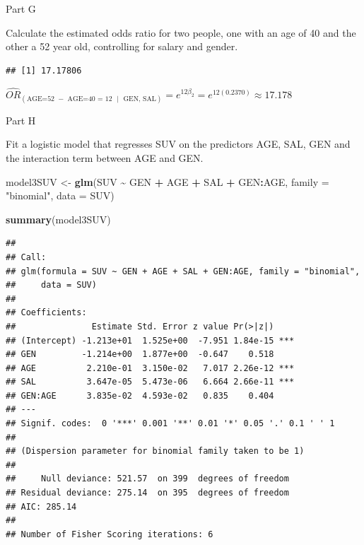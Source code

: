 \documentclass[
]{article}
\newenvironment{Shaded}{\begin{snugshade}}{\end{snugshade}}
\newcommand{\AttributeTok}[1]{\textcolor[rgb]{0.13,0.29,0.53}{#1}}
\newcommand{\DecValTok}[1]{\textcolor[rgb]{0.00,0.00,0.81}{#1}}
\newcommand{\FunctionTok}[1]{\textcolor[rgb]{0.13,0.29,0.53}{\textbf{#1}}}
\newcommand{\NormalTok}[1]{#1}
\newcommand{\OtherTok}[1]{\textcolor[rgb]{0.56,0.35,0.01}{#1}}
\newcommand{\SpecialCharTok}[1]{\textcolor[rgb]{0.81,0.36,0.00}{\textbf{#1}}}
\newcommand{\StringTok}[1]{\textcolor[rgb]{0.31,0.60,0.02}{#1}}
\begin{document}
Part G

Calculate the estimated odds ratio for two people, one with an age of 40
and the other a 52 year old, controlling for salary and gender.

\begin{Shaded}
\end{Shaded}

\begin{verbatim}
## [1] 17.17806
\end{verbatim}

\({{\widehat{OR}}_{\left( \text{AGE=52 }-\text{ AGE=40 = 12  }\text{  | } \text{  GEN, SAL} \right)}}={{e}^{12{{\beta }_{2}}}}={{e}^{12\left( 0.2370 \right)}}\approx 17.178\)

Part H

Fit a logistic model that regresses SUV on the predictors AGE, SAL, GEN
and the interaction term between AGE and GEN.

\begin{Shaded}
\begin{Highlighting}[]
\NormalTok{model3SUV }\OtherTok{\textless{}{-}} \FunctionTok{glm}\NormalTok{(SUV }\SpecialCharTok{\textasciitilde{}}\NormalTok{ GEN }\SpecialCharTok{+}\NormalTok{ AGE }\SpecialCharTok{+}\NormalTok{ SAL }\SpecialCharTok{+}\NormalTok{ GEN}\SpecialCharTok{:}\NormalTok{AGE, }\AttributeTok{family =} \StringTok{"binomial"}\NormalTok{, }\AttributeTok{data =}\NormalTok{ SUV)}

\FunctionTok{summary}\NormalTok{(model3SUV)}
\end{Highlighting}
\end{Shaded}

\begin{verbatim}
## 
## Call:
## glm(formula = SUV ~ GEN + AGE + SAL + GEN:AGE, family = "binomial", 
##     data = SUV)
## 
## Coefficients:
##               Estimate Std. Error z value Pr(>|z|)    
## (Intercept) -1.213e+01  1.525e+00  -7.951 1.84e-15 ***
## GEN         -1.214e+00  1.877e+00  -0.647    0.518    
## AGE          2.210e-01  3.150e-02   7.017 2.26e-12 ***
## SAL          3.647e-05  5.473e-06   6.664 2.66e-11 ***
## GEN:AGE      3.835e-02  4.593e-02   0.835    0.404    
## ---
## Signif. codes:  0 '***' 0.001 '**' 0.01 '*' 0.05 '.' 0.1 ' ' 1
## 
## (Dispersion parameter for binomial family taken to be 1)
## 
##     Null deviance: 521.57  on 399  degrees of freedom
## Residual deviance: 275.14  on 395  degrees of freedom
## AIC: 285.14
## 
## Number of Fisher Scoring iterations: 6
\end{verbatim}
\end{document}
